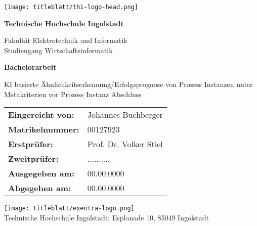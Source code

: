 \begin{titlepage}
    \flushright
    
    \texttt{[image: titleblatt/thi-logo-head.png]}
    
    \begin{center}
        \vspace*{1cm}
                
        \huge
        \textbf{Technische Hochschule Ingolstadt}
        
        \normalsize
        Fakultät Elektrotechnik und Informatik\\
        Studiengang Wirtschaftsinformatik
        
        \vspace{0.5cm}       
        \huge
        \textbf{Bachelorarbeit}

        \vspace{0.2cm}
        \normalsize
        KI basierte Ähnlichkeitserkennung/Erfolgsprognose von Prozess Instanzen unter Metakriterien vor Prozess Instanz Abschluss 
        
        \vspace{2cm}
        
        \begin{table}[h]
            \centering %
            \begin{tabular}{ll}
                \textbf{Eingereicht von:} & Johannes Buchberger \\
                \textbf{Matrikelnummer:} & 00127923 \\
                \textbf{Erstprüfer:} & Prof. Dr. Volker Stiel \\
                \textbf{Zweitprüfer:} & .......... \\
                \textbf{Ausgegeben am:} & 00.00.0000 \\
                \textbf{Abgegeben am:} & 00.00.0000
            \end{tabular}
        \end{table}

        \vspace{2cm}
        \texttt{[image: titleblatt/exentra-logo.png]}
        \\
        \large 
        Technische Hochschule Ingolstadt: Esplanade 10, 85049 Ingolstadt
    \end{center}
\end{titlepage}


